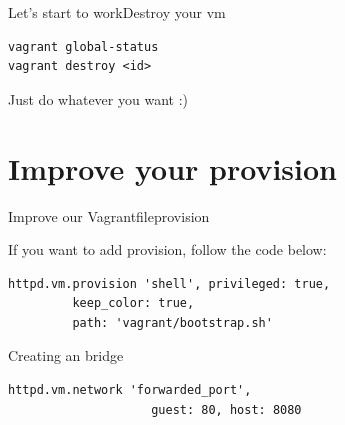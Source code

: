 \documentclass[10pt]{beamer}
\begin{document}
\begin{frame}[fragile]{Let's start to work}{Destroy your vm}
\begin{lstlisting}
vagrant global-status
vagrant destroy <id>
\end{lstlisting}
Just do whatever you want :)
\end{frame}

\section{Improve your provision}

\begin{frame}[fragile]{Improve our Vagrantfile}{provision}

If you want to add provision, follow the code below:

\begin{lstlisting}
httpd.vm.provision 'shell', privileged: true,
         keep_color: true,
         path: 'vagrant/bootstrap.sh'
\end{lstlisting}

\pause
Creating an bridge
\begin{lstlisting}
httpd.vm.network 'forwarded_port',
					guest: 80, host: 8080
\end{lstlisting}

\end{frame}

{\1
\begin{frame}
\end{frame}}
\end{document}

